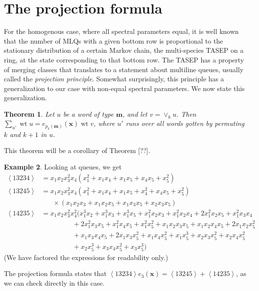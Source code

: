 \documentclass[submission]{FPSAC2018}
\newcommand{\0}{\phantom{c}}
\newcommand{\swt}[1]{\left\langle #1 \right\rangle} %
\newcommand{\merge}[2]{\vee_{#1}#2} %
\DeclareMathOperator{\wt}{wt} %
\newcommand{\xx}{\mathbf{x}}
\newcommand{\mm}{\mathbf{m}}
\let\sumnonlimits\sum
\renewcommand{\sum}{\sumnonlimits\limits}
\newcommand{\defn}[1]{{\color{darkred}\emph{#1}}} %
\theoremstyle{plain}
\newtheorem{thm}{Theorem}[section]
\theoremstyle{definition}
\newtheorem{example}[thm]{Example}
\numberwithin{equation}{section}
\begin{document}
\section{The projection formula}

For the homogenous case, where all spectral parameters equal, it is well known that the number of MLQs with a given bottom row is proportional to the stationary distribution of a certain Markov chain, the multi-species TASEP on a ring, at the state corresponding to that bottom row.
The TASEP has a property of merging classes that translates to a statement about multiline queues, usually called the \defn{projection principle}.
Somewhat surprisingly, this principle has a generalization to our case with non-equal spectral parameters.
We now state this generalization.

\begin{thm}
  Let $u$ be a word of type $\mm$, and let $v = \merge{k}{u}$.
  Then $\sum_{u'} \wt{u} = e_{p_k(\mm)}(\xx) \wt{v}$,
  where $u'$ runs over all words gotten by permuting $k$ and $k+1$ in $u$.
\end{thm}

This theorem will be a corollary of Theorem [??].


\begin{example}
Looking at queues, we get
\begin{align*}
\swt{13234} & = x_1 x_2 x_3^2 x_4 (x_1^2 + x_1 x_4 + x_1 x_5 + x_4 x_5 + x_5^2)
\\ \swt{13245} & = x_1 x_2 x_3^2 x_4 (x_1^2 + x_1x_4 + x_1x_5 + x_4^2 + x_4x_5 + x_5^2)
\\ & \hspace{20pt} \times (x_1x_2x_3 + x_1x_2x_5+x_1x_3x_5+x_2x_3x_5)
\\ \swt{14235} & = x_1x_2x_3^2x_4^2 (x_1^3x_2 + x_1^3x_3 + x_1^3x_5 + x_1^2x_2x_3 + x_1^2x_2x_4 + 2x_1^2x_2x_5 + x_1^2x_3x_4
\\ & \hspace{55pt} + 2x_1^2x_3x_5 + x_1^2x_4x_5 + x_1^2x_5^2 + x_1x_2x_3x_5 + x_1x_2x_4x_5 + 2x_1x_2x_5^2
\\ & \hspace{55pt} + x_1x_3x_4x_5 + 2x_1x_3x_5^2 + x_1x_4x_5^2 + x_1x_5^3 + x_2x_3x_5^2 + x_2x_4x_5^2
\\ & \hspace{55pt} + x_2x_5^3 + x_3x_4x_5^2 + x_3x_5^3)
\end{align*}
(We have factored the expressions for readability only.)

The projection formula states that $\swt{13234} e_3(\xx) = \swt{13245} + \swt{14235}$, as we can check directly in this case.
\end{example}
\end{document}
